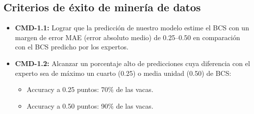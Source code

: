 \subsection{Criterios de éxito de minería de datos}

\begin{itemize}
  \item \textbf{CMD-1.1:} Lograr que la predicción de nuestro modelo estime el BCS con un margen de error MAE (error absoluto medio) de 0.25--0.50 en comparación con el BCS predicho por los expertos.
  \item \textbf{CMD-1.2:} Alcanzar un porcentaje alto de predicciones cuya diferencia con el experto sea de máximo un cuarto (0.25) o media unidad (0.50) de BCS:
  \begin{itemize}
    \item Accuracy a 0.25 puntos: 70\% de las vacas.
    \item Accuracy a 0.50 puntos: 90\% de las vacas.
  \end{itemize}
\end{itemize}
